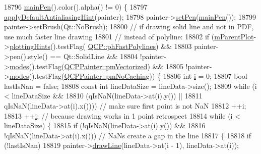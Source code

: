 \begin{DoxyCode}
18796       \hyperlink{class_q_c_p_abstract_plottable_a19276ed2382a3a06464417b8788b1451}{mainPen}().color().alpha() != 0) \{
18797     \hyperlink{class_q_c_p_abstract_plottable_a76e9d6cc7972dc1528f526d163766aca}{applyDefaultAntialiasingHint}(painter);
18798     painter->\hyperlink{class_q_c_p_painter_af9c7a4cd1791403901f8c5b82a150195}{setPen}(\hyperlink{class_q_c_p_abstract_plottable_a19276ed2382a3a06464417b8788b1451}{mainPen}());
18799     painter->setBrush(Qt::NoBrush);
18800     \textcolor{comment}{// if drawing solid line and not in PDF, use much faster line drawing}
18801     \textcolor{comment}{// instead of polyline:}
18802     \textcolor{keywordflow}{if} (\hyperlink{class_q_c_p_layerable_aa2a528433e44db02b8aef23c1f9f90ed}{mParentPlot}->\hyperlink{class_q_custom_plot_a130b55e205697a5288081e9fc11e443e}{plottingHints}().testFlag(
      \hyperlink{namespace_q_c_p_a5400e5fcb9528d92002ddb938c1f4ef4aa5fd227bc878c56ad2a87ea32c74ee4d}{QCP::phFastPolylines}) &&
18803         painter->pen().style() == Qt::SolidLine &&
18804         !painter->\hyperlink{class_q_c_p_painter_a99b89eaf5363faaa1e1e6162856f436c}{modes}().testFlag(\hyperlink{class_q_c_p_painter_a156cf16444ff5e0d81a73c615fdb156daeda679cd55dcd468341d07d48a30b6ab}{QCPPainter::pmVectorized}) &&
18805         !painter->\hyperlink{class_q_c_p_painter_a99b89eaf5363faaa1e1e6162856f436c}{modes}().testFlag(\hyperlink{class_q_c_p_painter_a156cf16444ff5e0d81a73c615fdb156dae78f9a4eb277a5f9207f50850a51a0b0}{QCPPainter::pmNoCaching})) \{
18806       \textcolor{keywordtype}{int} \hyperlink{_comparision_pictures_2_createtest_image_8m_a6f6ccfcf58b31cb6412107d9d5281426}{i} = 0;
18807       \textcolor{keywordtype}{bool} lastIsNan = \textcolor{keyword}{false};
18808       \textcolor{keyword}{const} \textcolor{keywordtype}{int} lineDataSize = lineData->size();
18809       \textcolor{keywordflow}{while} (i < lineDataSize &&
18810              (qIsNaN(lineData->at(i).y()) ||
18811               qIsNaN(lineData->at(i).x()))) \textcolor{comment}{// make sure first point is not NaN}
18812         ++i;
18813       ++\hyperlink{_comparision_pictures_2_createtest_image_8m_a6f6ccfcf58b31cb6412107d9d5281426}{i}; \textcolor{comment}{// because drawing works in 1 point retrospect}
18814       \textcolor{keywordflow}{while} (i < lineDataSize) \{
18815         \textcolor{keywordflow}{if} (!qIsNaN(lineData->at(i).y()) &&
18816             !qIsNaN(lineData->at(i).x())) \textcolor{comment}{// NaNs create a gap in the line}
18817         \{
18818           \textcolor{keywordflow}{if} (!lastIsNan)
18819             painter->\hyperlink{class_q_c_p_painter_a0b4b1b9bd495e182c731774dc800e6e0}{drawLine}(lineData->at(i - 1), lineData->at(i));

\end{DoxyCode}
